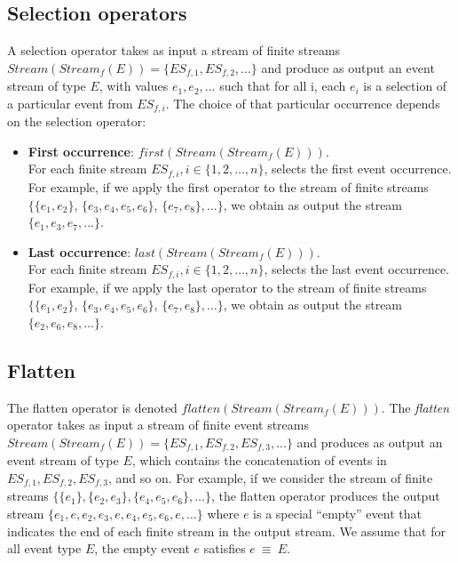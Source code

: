 \subsection{Selection operators}
A selection operator takes as input a stream of finite streams $Stream(Stream_f(E))= \{ES_{f,1}, ES_{f,2},...\}$ and produce as output an event stream of type $E$, with values ${e_1, e_2, … }$ such that for all i, each $e_i$ is a selection of a particular event from $ES_{f,i}$. The choice of that particular occurrence depends on the selection operator: %
\begin{itemize}
 \item \textbf{ First occurrence}: $first (Stream(Stream_f(E)))$. \\
For each finite stream $ES_{f,i}, i \in \{1, 2, …, n\}$, selects the first event occurrence. For example, if we apply the first operator to the stream of finite streams $\{\{e_1, e_2\}$, $\{ e_3, e_4, e_5, e_6\}$, $\{ e_7, e_8\},…\}$, we obtain as output the stream $\{e_1, e_3, e_7, …\}$.
   \item \textbf{Last occurrence}: $last (Stream(Stream_f(E)))$. \\
For each finite stream $ES_{f,i}, i \in \{1, 2, …, n\}$, selects the last event occurrence. For example, if we apply the last operator to the stream of finite streams $\{\{e_1, e_2\}$, $\{ e_3, e_4, e_5, e_6\}$, $\{ e_7, e_8\},…\}$, we obtain as output the stream $\{e_2, e_6, e_8, …\}$.
\end{itemize}
\subsection{Flatten}
The flatten operator is denoted $flatten(Stream(Stream_f(E)))$.
The \textit{flatten} operator takes as input a stream of finite event streams $Stream(Stream_f(E))= \{ES_{f,1}, ES_{f,2}, ES_{f,3}, ...\}$  and produces as output an event stream of type $E$, which contains the concatenation of events in $ES_{f,1}, ES_{f,2}, ES_{f,3}$, and so on. 
For example, if we consider the stream of finite streams $\{\{e_1\}, \{e_2, e_3\}, \{e_4, e_5, e_6\}, …\}$, the flatten operator produces the output stream $\{e_1, e, e_2, e_3,e, e_4, e_5, e_6, e, …\}$ where $e$ is a special “empty” event that indicates the end of each finite stream in the output stream. We assume that for all event type $E$, the empty event $e$ satisfies $e\ \equiv \ E$.

